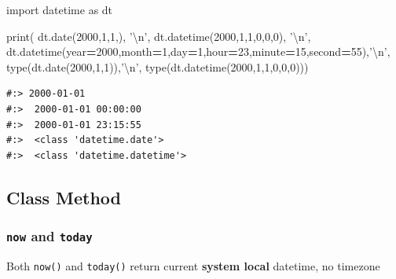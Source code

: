 \documentclass[
]{book}
\newenvironment{Shaded}{\begin{snugshade}}{\end{snugshade}}
\newcommand{\BuiltInTok}[1]{#1}
\newcommand{\CharTok}[1]{\textcolor[rgb]{0.5,0.5,0.5}{#1}}
\newcommand{\DecValTok}[1]{\textcolor[rgb]{0.06,0.06,0.06}{#1}}
\newcommand{\ImportTok}[1]{#1}
\newcommand{\NormalTok}[1]{#1}
\newcommand{\OperatorTok}[1]{\textcolor[rgb]{0.43,0.43,0.43}{\textbf{#1}}}
\newcommand{\StringTok}[1]{\textcolor[rgb]{0.5,0.5,0.5}{#1}}
\begin{document}
\begin{Shaded}
\begin{Highlighting}[]
\ImportTok{import}\NormalTok{ datetime }\ImportTok{as}\NormalTok{ dt}

\BuiltInTok{print}\NormalTok{( }
\NormalTok{    dt.date(}\DecValTok{2000}\NormalTok{,}\DecValTok{1}\NormalTok{,}\DecValTok{1}\NormalTok{,), }\StringTok{'}\CharTok{\textbackslash{}n}\StringTok{'}\NormalTok{,}
\NormalTok{    dt.datetime(}\DecValTok{2000}\NormalTok{,}\DecValTok{1}\NormalTok{,}\DecValTok{1}\NormalTok{,}\DecValTok{0}\NormalTok{,}\DecValTok{0}\NormalTok{,}\DecValTok{0}\NormalTok{), }\StringTok{'}\CharTok{\textbackslash{}n}\StringTok{'}\NormalTok{,}
\NormalTok{    dt.datetime(year}\OperatorTok{=}\DecValTok{2000}\NormalTok{,month}\OperatorTok{=}\DecValTok{1}\NormalTok{,day}\OperatorTok{=}\DecValTok{1}\NormalTok{,hour}\OperatorTok{=}\DecValTok{23}\NormalTok{,minute}\OperatorTok{=}\DecValTok{15}\NormalTok{,second}\OperatorTok{=}\DecValTok{55}\NormalTok{),}\StringTok{'}\CharTok{\textbackslash{}n}\StringTok{'}\NormalTok{,}
    \BuiltInTok{type}\NormalTok{(dt.date(}\DecValTok{2000}\NormalTok{,}\DecValTok{1}\NormalTok{,}\DecValTok{1}\NormalTok{)),}\StringTok{'}\CharTok{\textbackslash{}n}\StringTok{'}\NormalTok{,}
    \BuiltInTok{type}\NormalTok{(dt.datetime(}\DecValTok{2000}\NormalTok{,}\DecValTok{1}\NormalTok{,}\DecValTok{1}\NormalTok{,}\DecValTok{0}\NormalTok{,}\DecValTok{0}\NormalTok{,}\DecValTok{0}\NormalTok{)))}
\end{Highlighting}
\end{Shaded}

\begin{verbatim}
#:> 2000-01-01 
#:>  2000-01-01 00:00:00 
#:>  2000-01-01 23:15:55 
#:>  <class 'datetime.date'> 
#:>  <class 'datetime.datetime'>
\end{verbatim}

\hypertarget{class-method-1}{%
\subsection{Class Method}\label{class-method-1}}

\hypertarget{now-and-today}{%
\subsubsection{\texorpdfstring{\texttt{now} and \texttt{today}}{now and today}}\label{now-and-today}}

Both \texttt{now()} and \texttt{today()} return current \textbf{system local} datetime, no timezone
\end{document}
